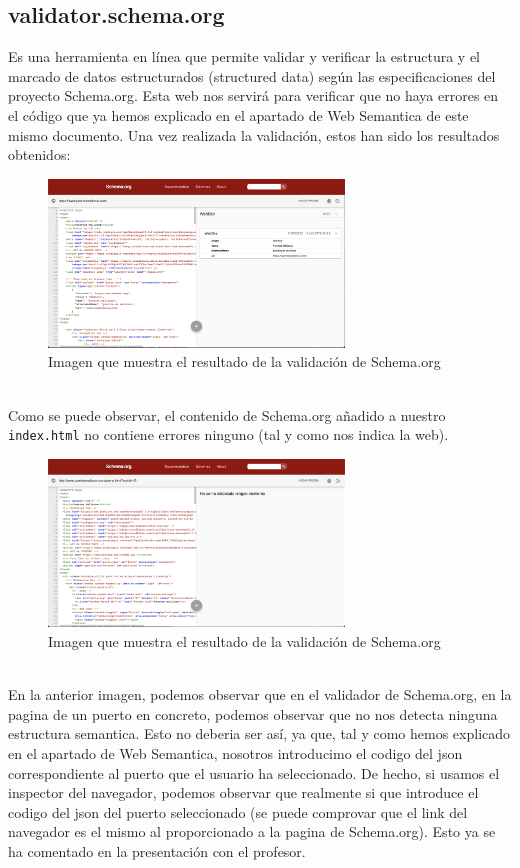 \documentclass{article}
\begin{document}
\subsection{validator.schema.org}
Es una herramienta en línea que permite validar y verificar la estructura y el marcado de datos estructurados (structured data) según las especificaciones del proyecto Schema.org. Esta web nos servirá para verificar que no haya errores en el código que ya hemos explicado en el apartado de Web Semantica de este mismo documento. Una vez realizada la validación, estos han sido los resultados obtenidos:
\begin{figure}[ht]
    \centering
    \includegraphics[width=0.7\textwidth]{images/schema.png}
    \caption{Imagen que muestra el resultado de la validación de Schema.org}
\end{figure}\\
Como se puede observar, el contenido de Schema.org añadido a nuestro \texttt{index.html} no contiene errores ninguno (tal y como nos indica la web).
\begin{figure}[ht]
    \centering
    \includegraphics[width=0.7\textwidth]{images/Schema.orgMal.png}
    \caption{Imagen que muestra el resultado de la validación de Schema.org}
\end{figure}\\
En la anterior imagen, podemos observar que en el validador de Schema.org, en la pagina de un puerto en concreto, podemos observar que no nos detecta ninguna estructura semantica. Esto no deberia ser así, ya que, tal y como hemos explicado en el apartado de Web Semantica, nosotros introducimo el codigo del json correspondiente al puerto que el usuario ha seleccionado. De hecho, si usamos el inspector del navegador, podemos observar que realmente si que introduce el codigo del json del puerto seleccionado (se puede comprovar que el link del navegador es el mismo al proporcionado a la pagina de Schema.org). Esto ya se ha comentado en la presentación con el profesor.
\end{document}
